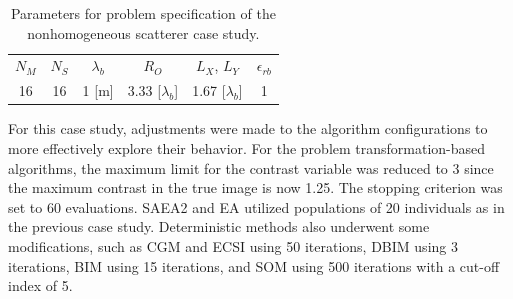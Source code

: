 			\begin{table}[!h]
				\centering
				\caption[Parameters for the nonhomogeneous scatterer case study.]{Parameters for problem specification of the nonhomogeneous scatterer case study.}
				\begin{tabular}{cccccc}
					$N_M$ & $N_S$ & $\lambda_b$ & $R_O$ & $L_X$, $L_Y$ & $\epsilon_{rb}$ \\
					16 & 16 & 1 [m] & 3.33 [$\lambda_b$] & 1.67 [$\lambda_b$] & 1
				\end{tabular}
				\label{tab:results:casestudy:nonhomogeneous:configuration}
			\end{table}
			
			For this case study, adjustments were made to the algorithm configurations to more effectively explore their behavior. For the problem transformation-based algorithms, the maximum limit for the contrast variable was reduced to 3 since the maximum contrast in the true image is now 1.25. The stopping criterion was set to 60 evaluations. SAEA2 and EA utilized populations of 20 individuals as in the previous case study. Deterministic methods also underwent some modifications, such as CGM and ECSI using 50 iterations, DBIM using 3 iterations, BIM using 15 iterations, and SOM using 500 iterations with a cut-off index of 5.
		
